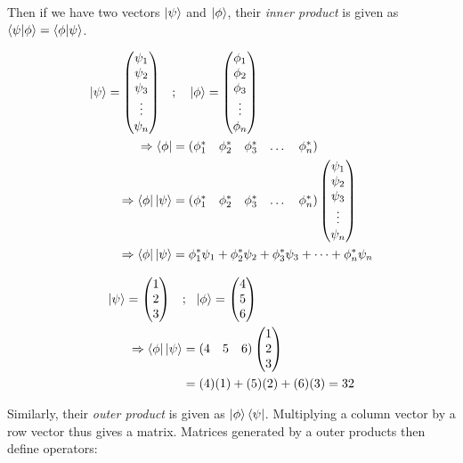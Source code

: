 Then if we have two vectors $\ket{\psi} $ and $\ket{\phi}$, their \emph{inner product} is given as $ \braket{\psi | \phi}  = \braket{ \phi | \psi} $. 

\begin{equation}
    \begin{split}
        \ket{\psi} = \left(\begin{matrix}\psi_1 \\ \psi_2 \\ \psi_3 \\ \vdots \\ \psi_n\end{matrix}\right) \ \ \ &; \ \ \ \ket{\phi} = \left(\begin{matrix}\phi_1 \\ \phi_2 \\\phi_3 \\ \vdots \\ \phi_n\end{matrix}\right) 
        \\ \Rightarrow \bra{\phi} &= \begin{matrix}(\phi_1^{*} & \phi_2^{*} & \phi_3^{*} & \dots & \phi_n^{*})\end{matrix}
        \\ \Rightarrow \bra{\phi} \ket{\psi} &= \begin{matrix}(\phi_1^{*} & \phi_2^{*} & \phi_3^{*} & \dots & \phi_n^{*})\end{matrix} \left(\begin{matrix}\psi_1 \\ \psi_2 \\ \psi_3 \\ \vdots \\ \psi_n\end{matrix}\right)
        \\ \Rightarrow \bra{\phi} \ket{\psi} &= \phi_1^{*} \psi_1  +  \phi_2^{*} \psi_2 +  \phi_3^{*} \psi_3 + \dots + \phi_n^{*} \psi_n 
    \end{split}
\end{equation}

\begin{example}
    \begin{equation}
        \begin{split}
            \ket{\psi} = \left(\begin{matrix}1 \\ 2 \\ 3\end{matrix}\right) \ \ \ &; \ \ \ket{\phi} = \left(\begin{matrix}4\\5\\6\end{matrix}\right) 
            \\ \Rightarrow \bra{\phi} \ket{\psi} &= \begin{matrix}(4 & 5 & 6)\end{matrix} \left(\begin{matrix}1\\2\\3\end{matrix}\right)
            \\ &= (4)(1) + (5)(2) +(6)(3) = 32
        \end{split}
    \end{equation}

\end{example}

Similarly, their \emph{outer product} is given as $\ket{\phi} \bra{\psi} $. 
Multiplying a column vector by a row vector thus gives a matrix. 
Matrices generated by a outer products then define operators: 
    
